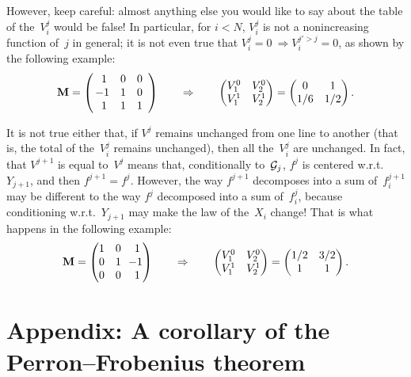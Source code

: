 However, keep careful: almost anything else
you would like to say about the table of the~$V_i^j$ would be false!
In particular, for $i<N$, $V_i^j$ is not a nonincreasing function of~$j$ in general;
it is not even true that $V_i^j = 0 \ \Rightarrow V_i^{j'>j} = 0$,
as shown by the following example:
\[\label{for9186a} \mathbf{M} = \left(\begin{array}{ccc} 1&0&0 \\ \!\!-1&1&0 \\ 1&1&1 \end{array}\right)
\qquad \Rightarrow \qquad
\begin{pmatrix} V_1^0 & V_2^0 \\ V_1^1 & V_2^1 \end{pmatrix} =
\begin{pmatrix} 0 & 1 \\ 1/6 & 1/2 \end{pmatrix} .\]

It is not true either that,
if $V^j$ remains unchanged from one line to another
(that is, the total of the~$V^j_i$ remains unchanged),
then all the~$V^j_i$ are unchanged.
In fact, that $V^{j+1}$ is equal to~$V^j$ means that, conditionally to~$\mathcal{G}_j$,
$f^j$ is centered w.r.t.~$Y_{j+1}$, and then $f^{j+1} = f^j$.
However, the way $f^{j+1}$ decomposes into a sum of~$f^{j+1}_i$
may be different to the way $f^j$ decomposed into a sum of~$f^j_i$,
because conditioning w.r.t.~$Y_{j+1}$ may make the law of the~$X_i$ change!
That is what happens in the following example:
%
\[\label{for9186b} \mathbf{M} = \begin{pmatrix} 1&0&1 \\ 0&1&\!\!-1 \\ 0&0&1 \end{pmatrix}
\qquad \Rightarrow \qquad
\begin{pmatrix} V_1^0 & V_2^0 \\ V_1^1 & V_2^1 \end{pmatrix} =
\begin{pmatrix} 1/2 & 3/2 \\ 1 & 1 \end{pmatrix} .\]




\section{Appendix: A corollary of the Perron--Fro\-be\-nius theorem}%
\label{parACorollaryOfThePerronFrobeniusTheorem}

